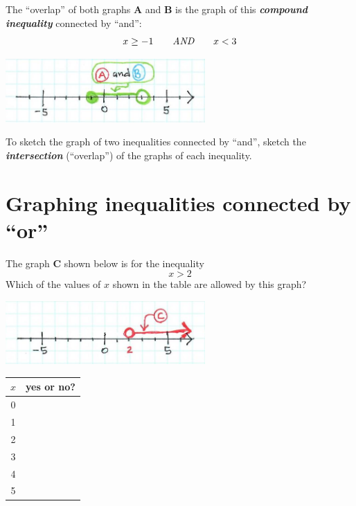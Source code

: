 \begin{myExample}{
    The ``overlap'' of 
    both graphs {\sffamily\bfseries A} and {\sffamily\bfseries B} 
    is the graph of this {\bfseries\itshape compound inequality} connected by ``and'':
    \[
        x \geq -1 \qquad \text{\itshape AND} \qquad x < 3
    \]
}
    \begin{center}
        \includegraphics[width=3in]{and-4.jpg}
    \end{center}
\end{myExample}

\begin{center}
\begin{tcolorbox}[width=5.5in]
    To sketch the graph of two inequalities connected by ``and'',
    sketch the {\bfseries\itshape intersection} (``overlap'') of the graphs of each inequality.
\end{tcolorbox}
\end{center}








\section*{Graphing inequalities connected by ``or''}


\begin{myExample}{
    The graph {\sffamily\bfseries C} shown below is for the inequality 
    \[
        x > 2
    \]
    Which of the values of $x$ shown in the table are allowed by this graph?
}
    \begin{center}
        \includegraphics[width=3in]{or-1.jpg}
        
        \Large
        \begin{tabular}{c|c}
            $x$ & yes or no? \\
            \toprule
            0& \\
            1& \\
            2& \\
            3& \\
            4& \\
            5& \\
            \bottomrule
        \end{tabular}
    \end{center}
\end{myExample}



